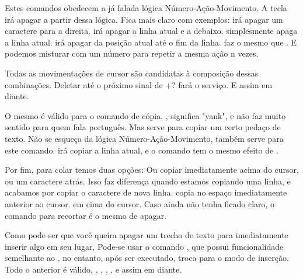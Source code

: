 Estes comandos obedecem a já falada lógica Número-Ação-Movimento.
A tecla  irá apagar a partir dessa lógica.
Fica mais claro com exemplos:  irá apagar um caractere para a direita.
 irá apagar a linha atual e a debaixo.
 simplesmente apaga a linha atual.
 irá apagar da posição atual até o fim da linha.
 faz o mesmo que .
E podemos misturar com um número para repetir a mesma ação n vezes.

Todas as movimentações de cursor são candidatas à composição dessas combinações.
Deletar até o próximo sinal de +?  fará o serviço.
E assim em diante.

O mesmo é válido para o comando de cópia.
, significa "yank", e não faz muito sentido para quem fala português.
Mas serve para copiar um certo pedaço de texto.
Não se esqueça da lógica Número-Ação-Movimento, também serve para este comando.
 irá copiar a linha atual, e o comando  tem o mesmo efeito de .

Por fim, para colar temos duas opções: Ou copiar imediatamente acima do cursor, ou um caractere atrás.
Isso faz diferença quando estamos copiando uma linha, e acabamos por copiar o caractere de nova linha.
 copia no espaço imediatamente anterior ao cursor.  em cima do cursor.
Caso ainda não tenha ficado claro, o comando para recortar é o mesmo de apagar.

Como pode ser que você queira apagar um trecho de texto para imediatamente inserir algo em seu lugar,
Pode-se usar o comando , que possui funcionalidade semelhante ao ,
no entanto, após ser executado, troca para o modo de inserção.
Todo o anterior é válido, , , , , e assim em diante.

